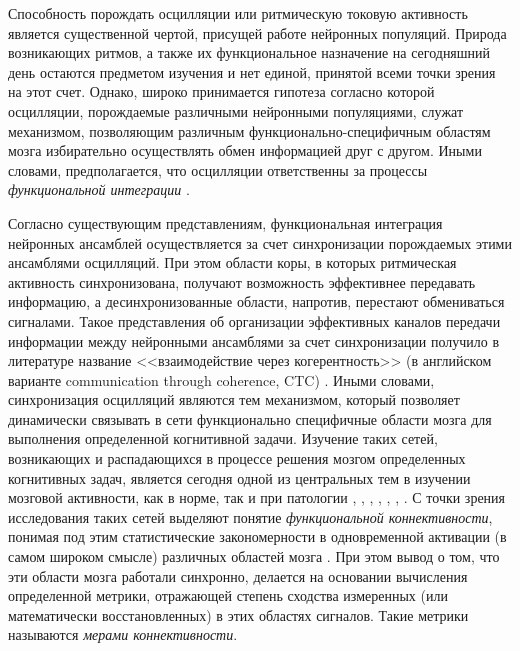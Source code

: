 Способность порождать осцилляции или ритмическую токовую активность является существенной чертой, 
присущей работе нейронных популяций. Природа возникающих ритмов, а также их функциональное назначение
на сегодняшний день остаются предметом изучения и нет единой, принятой всеми точки зрения на этот счет.
Однако, широко принимается гипотеза согласно которой осцилляции, порождаемые различными нейронными популяциями,
служат механизмом, позволяющим различным функционально-специфичным областям мозга
избирательно осуществлять обмен информацией друг с другом. Иными словами, предполагается, что осцилляции ответственны за 
процессы \emph{функциональной интеграции} \cite{}. 

Согласно существующим представлениям, функциональная интеграция нейронных ансамблей осуществляется за
счет синхронизации порождаемых этими ансамблями осцилляций. При этом области коры, в которых ритмическая 
активность синхронизована, получают возможность эффективнее передавать информацию, а десинхронизованные 
области, напротив, перестают обмениваться сигналами. Такое представления об организации эффективных каналов 
передачи информации между нейронными ансамблями за счет синхронизации получило в литературе название 
<<взаимодействие через когерентность>> (в английском варианте communication through coherence, CTC)
. Иными словами, синхронизация осцилляций 
являются тем механизмом, который позволяет динамически связывать в сети функционально специфичные области мозга 
для выполнения определенной когнитивной задачи. Изучение таких сетей, возникающих и распадающихся в процессе решения мозгом
определенных когнитивных задач, является сегодня одной из центральных тем в изучении мозговой активности, как в норме,
так и при патологии ,
, ,
, , \cite{myself}, \cite{myself}.
С точки зрения исследования таких сетей выделяют понятие \emph{функциональной коннективности}, понимая 
под этим статистические закономерности в одновременной активации (в самом широком смысле) различных областей мозга \cite{}. 
При этом вывод о том, что эти области мозга работали синхронно, делается на основании вычисления 
определенной метрики, отражающей степень сходства измеренных (или математически восстановленных) в этих областях сигналов.
Такие метрики называются \emph{мерами коннективности}.

